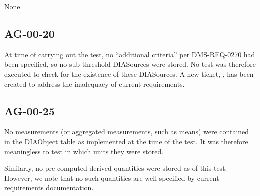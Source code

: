 \documentclass[DM,lsstdraft,STR,toc]{lsstdoc}
\begin{document}
None.

\subsection{AG-00-20}
\label{sect:deviation-ag-00-20}

At time of carrying out the test, no ``additional criteria'' per DMS-REQ-0270 had been specified, so no sub-threshold DIASources were stored.
No test was therefore executed to check for the existence of these DIASources.
A new ticket, , has been created to address the inadequacy of current requirements.

\subsection{AG-00-25}
\label{sect:deviation-ag-00-25}

No measurements (or aggregated measurements, such as means) were contained in
the DIAObject table as implemented at the time of the test. It was
therefore meaningless to test in which units they were stored.

Similarly, no pre-computed derived quantities were stored as of this test.
However, we note that no such quantities are well specified by current requirements documentation.
\end{document}
